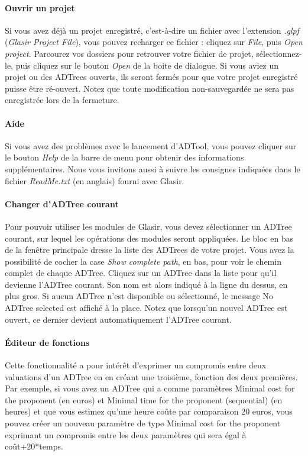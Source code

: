 \paragraph{Ouvrir un projet} Si vous avez déjà un projet enregistré, c'est-à-dire un fichier avec l'extension \emph{.glpf} (\emph{Glasir Project File}), vous pouvez recharger ce fichier : cliquez sur \emph{File}, puis \emph{Open project}. Parcourez vos dossiers pour retrouver votre fichier de projet, sélectionnez-le, puis cliquez sur le bouton \emph{Open} de la boite de dialogue. Si vous aviez un projet ou des ADTrees ouverts, ils seront fermés pour que votre projet enregistré puisse être ré-ouvert. Notez que toute modification non-sauvegardée ne sera pas enregistrée lors de la fermeture.

\paragraph{Aide} Si vous avez des problèmes avec le lancement d'ADTool, vous pouvez cliquer sur le bouton \emph{Help} de la barre de menu pour obtenir des informations supplémentaires. Nous vous invitons aussi à suivre les consignes indiquées dans le fichier \emph{ReadMe.txt} (en anglais) fourni avec Glasir.

\paragraph{Changer d'ADTree courant} Pour pouvoir utiliser les modules de Glasir, vous devez sélectionner un ADTree courant, sur lequel les opérations des modules seront appliquées. Le bloc en bas de la fenêtre principale dresse la liste des ADTrees de votre projet.  Vous avez la possibilité de cocher la case \emph{Show complete path}, en bas, pour voir le chemin complet de chaque ADTree. Cliquez sur un ADTree dans la liste pour qu'il devienne l'ADTree courant. Son nom est alors indiqué à la ligne du dessus, en plus gros. Si aucun ADTree n'est disponible ou sélectionné, le message \og No ADTree selected \fg{} est affiché à la place. Notez que lorsqu'un nouvel ADTree est ouvert, ce dernier devient automatiquement l'ADTree courant.

\paragraph{Éditeur de fonctions} Cette fonctionnalité a pour intérêt d'exprimer un compromis entre deux valuations d'un ADTree en en créant une troisième, fonction des deux premières. Par exemple, si vous avez un ADTree qui a comme paramètres \og Minimal cost for the proponent \fg (en euros) et \og Minimal time for the proponent (sequential) \fg (en heures) et que vous estimez qu'une heure \og coûte \fg par comparaison 20 euros, vous pouvez créer un nouveau paramètre de type \og Minimal cost for the proponent \fg exprimant un compromis entre les deux paramètres qui sera égal à coût+20*temps.

